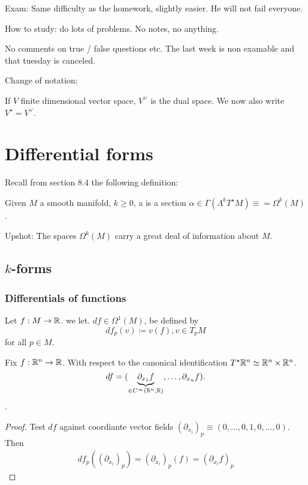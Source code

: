 
Exam:  Same difficulty as the homework, slightly easier. He will not fail everyone.

How to study: do lots of problems. No notes, no anything.

No comments on true / false questions etc. The last week is non examable and that tuesday is canceled.

Change of notation: 

If \(V\) finite dimensional vector space, \(V^\vee\) is the dual space. We now also write 
\(V^\star=V^\vee\).

\chapter{Differential forms}

Recall from section 8.4 the following definition:

\begin{definition*}
    Given \(M\) a smooth manifold, \(k\geq 0\), a  is a section 
    \(\alpha\in \Gamma(\Lambda^kT^\star M)\equiv=\Omega^k(M)\).
\end{definition*}

Upshot: The spaces \(\Omega^k(M)\) carry a great deal of information about \(M\).

\section{\(k\)-forms}

\subsection{Differentials of functions}

\begin{definition*}
    Let \(f:M\to \mathbb{R}\). we let. \(df\in\Omega^1(M)\),
    be defined by \[df_p(v)\coloneqq v(f),v\in T_pM\]
    for all \(p\in M\). 
\end{definition*}

\begin{lemma}\label{lem:10.1}
    Fix \(f:\mathbb{R}^n\to \mathbb{R}\). With respect to the canonical identification
    \(T^\star\mathbb{R}^n\simeq \mathbb{R}^n\times \mathbb{R}^n\).
    \[df=(\underbrace{\partial_{x_1} f}_{\in C^\infty(\mathbb{R}^n,\mathbb{R})},\dots, \partial_{x_n}f).\] .
\end{lemma}

\begin{proof}
    Test \(df\) against coordiante vector fields \((\partial_{x_i})_p\equiv (0,\dots,0,1,0,\dots,0)\).
    Then \begin{align}
        df_p((\partial_{x_i})_p)=(\partial_{x_i})_p (f)=(\partial_{x_i}f)_p
    \end{align}
\end{proof}

